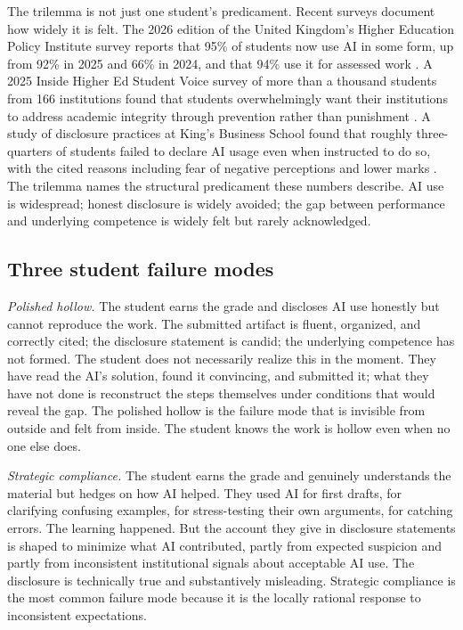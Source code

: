 \documentclass{SIAMbook2023}
\begin{document}
The trilemma is not just one student's predicament. Recent surveys document how widely it is felt. The 2026 edition of the United Kingdom's Higher Education Policy Institute survey reports that 95\% of students now use AI in some form, up from 92\% in 2025 and 66\% in 2024, and that 94\% use it for assessed work \citep{stephenson2026student, hepi2025students}. A 2025 Inside Higher Ed Student Voice survey of more than a thousand students from 166 institutions found that students overwhelmingly want their institutions to address academic integrity through prevention rather than punishment \citep{insidehighered2025studentvoice}. A study of disclosure practices at King's Business School found that roughly three-quarters of students failed to declare AI usage even when instructed to do so, with the cited reasons including fear of negative perceptions and lower marks \citep{gonsalves2024addressing}. The trilemma names the structural predicament these numbers describe. AI use is widespread; honest disclosure is widely avoided; the gap between performance and underlying competence is widely felt but rarely acknowledged.

\subsection{Three student failure modes}
\label{subsec:trilemma-failures}%

\textit{Polished hollow.} The student earns the grade and discloses AI use honestly but cannot reproduce the work. The submitted artifact is fluent, organized, and correctly cited; the disclosure statement is candid; the underlying competence has not formed. The student does not necessarily realize this in the moment. They have read the AI's solution, found it convincing, and submitted it; what they have not done is reconstruct the steps themselves under conditions that would reveal the gap. The polished hollow is the failure mode that is invisible from outside and felt from inside. The student knows the work is hollow even when no one else does.

\textit{Strategic compliance.} The student earns the grade and genuinely understands the material but hedges on how AI helped. They used AI for first drafts, for clarifying confusing examples, for stress-testing their own arguments, for catching errors. The learning happened. But the account they give in disclosure statements is shaped to minimize what AI contributed, partly from expected suspicion and partly from inconsistent institutional signals about acceptable AI use. The disclosure is technically true and substantively misleading. Strategic compliance is the most common failure mode because it is the locally rational response to inconsistent expectations.
\end{document}
